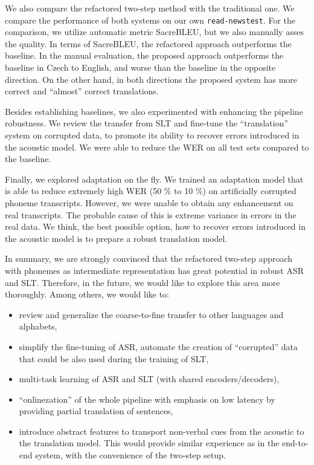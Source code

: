 We also compare the refactored two-step method with the traditional one. We compare the performance of both systems on our own \texttt{read-newstest}. For the comparison, we utilize automatic metric SacreBLEU, but we also manually asses the quality. In terms of SacreBLEU, the refactored approach outperforms the baseline. In the manual evaluation, the proposed approach outperforms the baseline in Czech to English, and worse than the baseline in the opposite direction. On the other hand, in both directions the proposed system has more correct and ``almost'' correct translations.

Besides establishing baselines, we also experimented with enhancing the pipeline robustness. We review the transfer from SLT and fine-tune the ``translation'' system on corrupted data, to promote its ability to recover errors introduced in the acoustic model. We were able to reduce the WER on all test sets compared to the baseline.

Finally, we explored adaptation on the fly. We trained an adaptation model that is able to reduce extremely high WER (50 \% to 10 \%) on artificially corrupted phoneme transcripts. However, we were unable to obtain any enhancement on real transcripts. The probable cause of this is extreme variance in errors in the real data. We think, the best possible option, how to recover errors introduced in the acoustic model is to prepare a robust translation model. 

In summary, we are strongly convinced that the refactored two-step approach with phonemes as intermediate representation has great potential in robust ASR and SLT. Therefore, in the future, we would like to explore this area more thoroughly. Among others, we would like to:

\begin{itemize}
	\item review and generalize the coarse-to-fine transfer to other languages and alphabets,
	\item simplify the fine-tuning of ASR, automate the creation of ``corrupted'' data that could be also used during the training of SLT,
	\item multi-task learning of ASR and SLT (with shared encoders/decoders),
	\item ``onlinezation'' of the whole pipeline with emphasis on low latency by providing partial translation of sentences,
	\item introduce abstract features to transport non-verbal cues from the acoustic to the translation model. This would provide similar experience as in the end-to-end system, with the convenience of the two-step setup.
\end{itemize}